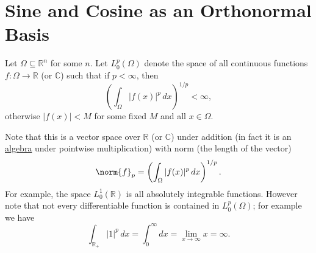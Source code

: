 \section{Sine and Cosine as an Orthonormal Basis}

\begin{definition}
Let $\Omega \subseteq \mathbb{R}^n$ for some $n$. Let $L_0^p(\Omega)$ denote the space of all continuous functions $f \colon \Omega \rightarrow \mathbb{R}$ (or $\mathbb{C}$) such that if $p < \infty$, then
\[
\left( \int_{\Omega} |f(x)|^p \, dx \right)^{1/p} < \infty,
\]
otherwise $|f(x)| < M$ for some fixed $M$ and all $x \in \Omega$.
\end{definition}
Note that this is a vector space over $\mathbb{R}$ (or $\mathbb{C}$) under addition (in fact it is an \hyperref[algebras]{algebra} under pointwise multiplication) with norm (the length of the vector)
\[
\norm{f}_p = \left( \int_{\Omega} |f(x)|^p \, dx \right)^{1/p}.
\]
For example, the space $L_0^1(\mathbb{R})$ is all absolutely integrable functions. However note that not every differentiable function is contained in $L_0^p(\Omega)$; for example we have
\[
\int_{\mathbb{R}_+} |1|^p \, dx = \int_0^{\infty} dx = \lim_{x \rightarrow \infty} x = \infty.
\]

